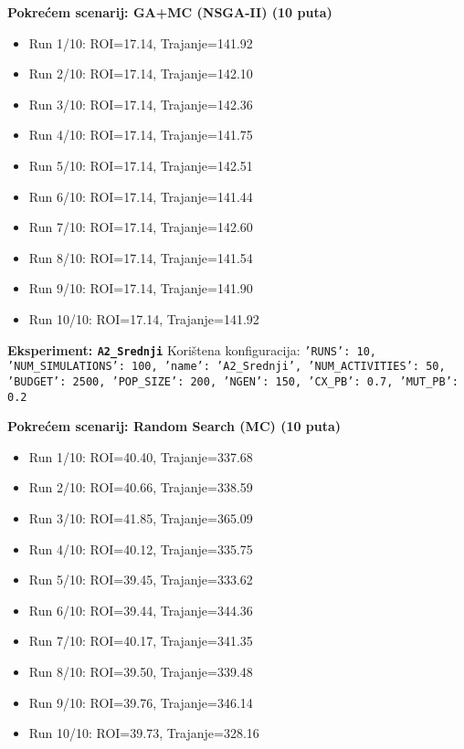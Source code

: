 \textbf{Pokrećem scenarij: GA+MC (NSGA-II) (10 puta)}
\begin{itemize}
    \item Run 1/10: ROI=17.14, Trajanje=141.92
    \item Run 2/10: ROI=17.14, Trajanje=142.10
    \item Run 3/10: ROI=17.14, Trajanje=142.36
    \item Run 4/10: ROI=17.14, Trajanje=141.75
    \item Run 5/10: ROI=17.14, Trajanje=142.51
    \item Run 6/10: ROI=17.14, Trajanje=141.44
    \item Run 7/10: ROI=17.14, Trajanje=142.60
    \item Run 8/10: ROI=17.14, Trajanje=141.54
    \item Run 9/10: ROI=17.14, Trajanje=141.90
    \item Run 10/10: ROI=17.14, Trajanje=141.92
\end{itemize}

\textbf{Eksperiment: \texttt{A2\_Srednji}}
Korištena konfiguracija: \texttt{'RUNS': 10, 'NUM\_SIMULATIONS': 100, 'name': 'A2\_Srednji', 'NUM\_ACTIVITIES': 50, 'BUDGET': 2500, 'POP\_SIZE': 200, 'NGEN': 150, 'CX\_PB': 0.7, 'MUT\_PB': 0.2}

\textbf{Pokrećem scenarij: Random Search (MC) (10 puta)}
\begin{itemize}
    \item Run 1/10: ROI=40.40, Trajanje=337.68
    \item Run 2/10: ROI=40.66, Trajanje=338.59
    \item Run 3/10: ROI=41.85, Trajanje=365.09
    \item Run 4/10: ROI=40.12, Trajanje=335.75
    \item Run 5/10: ROI=39.45, Trajanje=333.62
    \item Run 6/10: ROI=39.44, Trajanje=344.36
    \item Run 7/10: ROI=40.17, Trajanje=341.35
    \item Run 8/10: ROI=39.50, Trajanje=339.48
    \item Run 9/10: ROI=39.76, Trajanje=346.14
    \item Run 10/10: ROI=39.73, Trajanje=328.16
\end{itemize}

